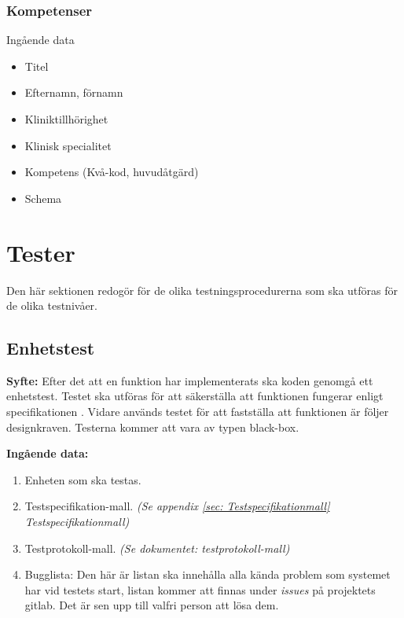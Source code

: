 \documentclass[a4paper,10pt]{article}
\begin{document}
\subsubsection{Kompetenser}
\label{sec: Kompetenser}
Ingående data
\begin{multicols}{2}
\begin{itemize}
	\item Titel
	\item Efternamn, förnamn
	\item Kliniktillhörighet
	\item Klinisk specialitet
	\item Kompetens (Kvå-kod, huvudåtgärd)
	\item Schema
\end{itemize}
\end{multicols}

\section{Tester}
Den här sektionen redogör för de olika testningsprocedurerna som ska utföras för de olika testnivåer.

\subsection{Enhetstest}
\label{sec:Enhetstest}
  \textbf{Syfte:} Efter det att en funktion har implementerats ska koden genomgå ett enhetstest. Testet ska utföras för att säkerställa att funktionen     	   fungerar enligt specifikationen \cite{kravspec}. Vidare används testet för att fastställa att funktionen är följer designkraven. Testerna kommer att 	   vara av typen black-box. 

  \textbf{Ingående data:}
    \begin{enumerate}
      \item Enheten som ska testas.
      \item Testspecifikation-mall.
      \emph{(Se appendix \ref{sec: Testspecifikationmall} Testspecifikationmall)}
      \item Testprotokoll-mall. \emph{(Se dokumentet: testprotokoll-mall)}
      \item Bugglista: Den här är listan ska innehålla alla kända problem som
      systemet har vid testets start, listan kommer att finnas under
      \emph{issues} på projektets gitlab. Det är sen upp till valfri person att lösa dem.
    \end{enumerate}
\end{document}
